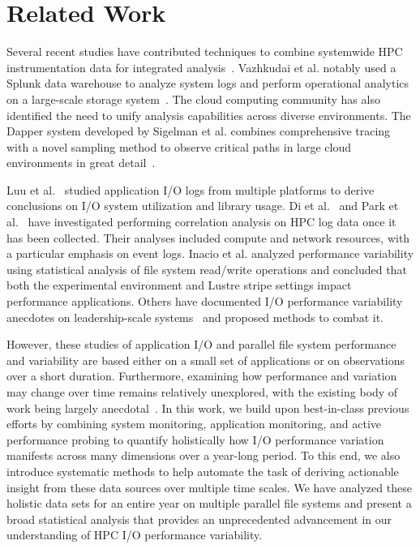 \section{Related Work} \label{sec:related}

Several recent studies have contributed techniques to combine
systemwide HPC instrumentation data for integrated
analysis~\cite{Lockwood2017,Vazhkudai2017guide,Agelastos2014ldms,Kunkel2014siox,RIOT_2013}.
Vazhkudai et al. notably used a Splunk data warehouse to analyze system
logs and perform operational analytics on a large-scale storage system~\cite{Vazhkudai2017guide}.
The cloud computing community has also identified the need to unify
analysis capabilities across diverse environments.
The Dapper system
developed by Sigelman et al. combines comprehensive tracing with a novel
sampling method to observe critical paths in large cloud environments in great
detail~\cite{Sigelman2010dapper}.

Luu et al.~\cite{Luu:2015:HPDC} studied application I/O logs from multiple platforms to derive conclusions on I/O system utilization and library usage.
Di et al.~\cite{7973730} and Park et al.~\cite{Park2017BigDM} have
investigated performing correlation analysis on HPC log data once it has been
collected.  Their analyses included compute and network resources, with a
particular emphasis on event logs. Inacio et al. analyzed performance variability using statistical analysis of file system read/write operations and concluded that both the experimental environment and Lustre stripe settings impact performance applications. 
Others have documented 
I/O performance variability anecdotes on leadership-scale
systems~\cite{Lofstead2010,Yildiz2016,carns2011understanding} and proposed
methods to combat it.  

However, these studies of application I/O and parallel file system performance and variability are based either on a small set of applications or on observations over a short duration.
Furthermore, examining how performance and variation may change over time remains relatively unexplored, with the existing body of work being largely anecdotal~\cite{Haryadi2018fail}.
In this work, we build upon best-in-class previous efforts by combining system monitoring, application monitoring, and active performance probing
to quantify holistically how I/O performance variation manifests across many dimensions over a year-long period.
To this end, we also introduce systematic methods to help automate the task of deriving actionable insight from these data sources over multiple time scales.
We have analyzed these holistic data sets for an entire year on multiple parallel file systems and present a broad statistical analysis that provides an unprecedented advancement in our understanding of HPC I/O performance variability.